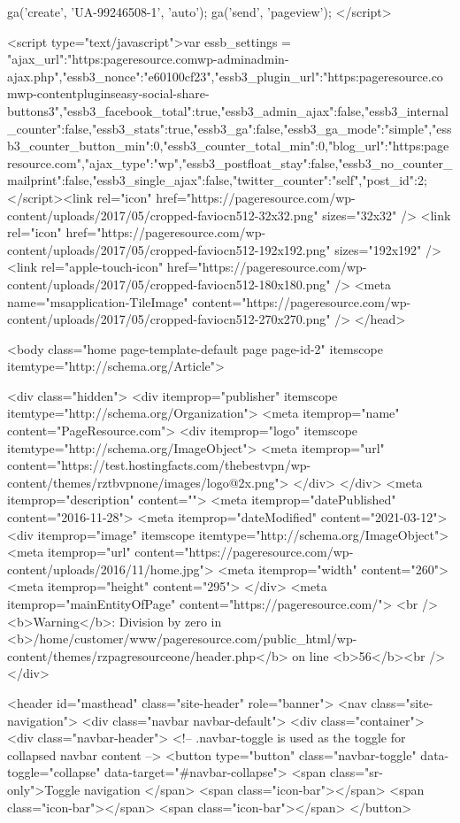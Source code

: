 {    ga('create', 'UA-99246508-1', 'auto');
    ga('send', 'pageview');
  </script>
  
<script type="text/javascript">var essb_settings = {"ajax_url":"https:\/\/pageresource.com\/wp-admin\/admin-ajax.php","essb3_nonce":"e60100cf23","essb3_plugin_url":"https:\/\/pageresource.com\/wp-content\/plugins\/easy-social-share-buttons3","essb3_facebook_total":true,"essb3_admin_ajax":false,"essb3_internal_counter":false,"essb3_stats":true,"essb3_ga":false,"essb3_ga_mode":"simple","essb3_counter_button_min":0,"essb3_counter_total_min":0,"blog_url":"https:\/\/pageresource.com\/","ajax_type":"wp","essb3_postfloat_stay":false,"essb3_no_counter_mailprint":false,"essb3_single_ajax":false,"twitter_counter":"self","post_id":2};</script><link rel="icon" href="https://pageresource.com/wp-content/uploads/2017/05/cropped-faviocn512-32x32.png" sizes="32x32" />
<link rel="icon" href="https://pageresource.com/wp-content/uploads/2017/05/cropped-faviocn512-192x192.png" sizes="192x192" />
<link rel="apple-touch-icon" href="https://pageresource.com/wp-content/uploads/2017/05/cropped-faviocn512-180x180.png" />
<meta name="msapplication-TileImage" content="https://pageresource.com/wp-content/uploads/2017/05/cropped-faviocn512-270x270.png" />
</head>

<body class="home page-template-default page page-id-2" itemscope itemtype="http://schema.org/Article">
	
	<div class="hidden">
		<div itemprop="publisher" itemscope itemtype="http://schema.org/Organization">
			<meta itemprop="name" content="PageResource.com">
			<div itemprop="logo" itemscope itemtype="http://schema.org/ImageObject">
				<meta itemprop="url" content="https://test.hostingfacts.com/thebestvpn/wp-content/themes/rztbvpnone/images/logo@2x.png">
			</div>
		</div>
		<meta itemprop="description" content="">
		<meta itemprop="datePublished" content="2016-11-28">
		<meta itemprop="dateModified" content="2021-03-12">
		<div itemprop="image" itemscope itemtype="http://schema.org/ImageObject">
			<meta itemprop="url" content="https://pageresource.com/wp-content/uploads/2016/11/home.jpg">
			<meta itemprop="width" content="260">
			<meta itemprop="height" content="295">
		</div>
		<meta itemprop="mainEntityOfPage" content="https://pageresource.com/">
		<br />
<b>Warning</b>:  Division by zero in <b>/home/customer/www/pageresource.com/public_html/wp-content/themes/rzpagresourceone/header.php</b> on line <b>56</b><br />
			</div>

<header id="masthead" class="site-header" role="banner">
	<nav class="site-navigation">
		<div class="navbar navbar-default">
			<div class="container">
				<div class="navbar-header">
					<!-- .navbar-toggle is used as the toggle for collapsed navbar content -->
					<button type="button" class="navbar-toggle" data-toggle="collapse" data-target="#navbar-collapse">
						<span class="sr-only">Toggle navigation </span>
						<span class="icon-bar"></span>
						<span class="icon-bar"></span>
						<span class="icon-bar"></span>
					</button>

}
